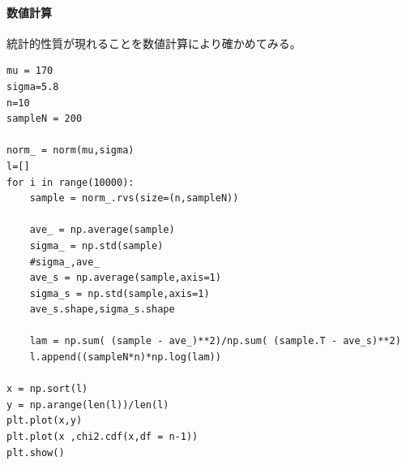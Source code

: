 \paragraph{数値計算}
統計的性質が現れることを数値計算により確かめてみる。
\begin{lstlisting}
mu = 170
sigma=5.8
n=10
sampleN = 200

norm_ = norm(mu,sigma)
l=[]
for i in range(10000):
    sample = norm_.rvs(size=(n,sampleN))

    ave_ = np.average(sample)
    sigma_ = np.std(sample) 
    #sigma_,ave_
    ave_s = np.average(sample,axis=1)
    sigma_s = np.std(sample,axis=1)
    ave_s.shape,sigma_s.shape

    lam = np.sum( (sample - ave_)**2)/np.sum( (sample.T - ave_s)**2)
    l.append((sampleN*n)*np.log(lam))

x = np.sort(l)
y = np.arange(len(l))/len(l)
plt.plot(x,y)
plt.plot(x ,chi2.cdf(x,df = n-1))
plt.show()
\end{lstlisting}